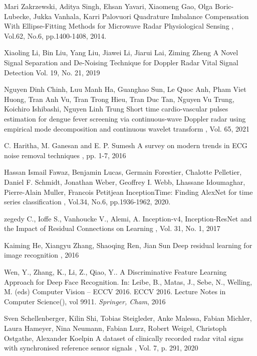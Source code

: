 \begin{bib}[100]
  Mari Zakrzewski, Aditya Singh, Ehsan Yavari, Xiaomeng Gao, Olga Boric-Lubecke, Jukka Vanhala, Karri Palovuori
  \newblock Quadrature Imbalance Compensation With Ellipse-Fitting Methods for Microwave Radar Physiological Sensing
  , Vol.62, No.6, pp.1400-1408, 2014.

Xiaoling Li, Bin Liu, Yang Liu, Jiawei Li, Jiarui Lai, Ziming Zheng
\newblock A Novel Signal Separation and De-Noising Technique for Doppler Radar Vital Signal Detection
 Vol. 19, No. 21, 2019

Nguyen Dinh Chinh, Luu Manh Ha, Guanghao Sun, Le Quoc Anh, Pham Viet Huong, Tran Anh Vu, Tran Trong Hieu, Tran Duc Tan, Nguyen Vu Trung, Koichiro Ishibashi, Nguyen Linh Trung
\newblock Short time cardio-vascular pulses estimation for dengue fever screening via continuous-wave Doppler radar using empirical mode decomposition and continuous wavelet transform
, Vol. 65, 2021

C. Haritha, M. Ganesan and E. P. Sumesh
\newblock A survey on modern trends in ECG noise removal techniques
, pp. 1-7, 2016 

  Hassan Ismail Fawaz, Benjamin Lucas, Germain Forestier, Chalotte Pelletier, Daniel F. Schmidt, Jonathan Weber, Geoffrey I. Webb, Lhassane Idoumaghar, Pierre-Alain Muller, Francois Petitjean
  \newblock InceptionTime: Finding AlexNet for time series classification
  , Vol.34, No.6, pp.1936-1962, 2020.

zegedy C., Ioffe S., Vanhoucke V., Alemi, A.
\newblock Inception-v4, Inception-ResNet and the Impact of Residual Connections on Learning
, Vol. 31, No. 1, 2017

Kaiming He, Xiangyu Zhang, Shaoqing Ren, Jian Sun
\newblock Deep residual learning for image recognition
, 2016

Wen, Y., Zhang, K., Li, Z., Qiao, Y.. A Discriminative Feature Learning Approach for Deep Face Recognition. In: Leibe, B., Matas, J., Sebe, N., Welling, M. (eds) Computer Vision – ECCV 2016. ECCV 2016. Lecture Notes in Computer Science(), vol 9911. {\it Springer, Cham}, 2016

Sven Schellenberger, Kilin Shi, Tobias Steigleder, Anke Malessa, Fabian Michler, Laura Hameyer, Nina Neumann, Fabian Lurz, Robert Weigel, Christoph Ostgathe, Alexander Koelpin
\newblock A dataset of clinically recorded radar vital signs with synchronised reference sensor signals
, Vol. 7, p. 291, 2020

\end{bib}

